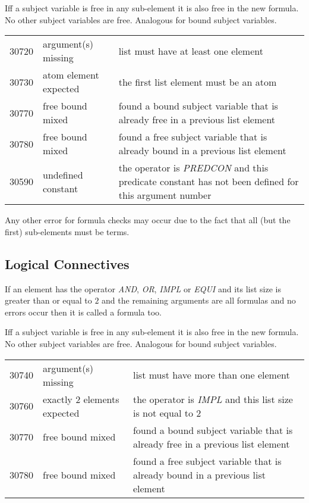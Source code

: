 \documentclass[a4paper,german,10pt,twoside]{book}
\theoremstyle{definition}
\theoremstyle{remark}
\begin{document}
\par
Iff a subject variable is free in any sub-element it is also free in the new formula. No other subject variables are free. Analogous for bound subject variables. 

\begin{tabularx}{\linewidth}{llX}
  30720  & argument(s) missing      & list must have at least one element \\
  30730  & atom element expected    & the first list element must be an atom \\ 
  30770  & free bound mixed         & found a bound subject variable that is already free in a previous list element \\
  30780  & free bound mixed         & found a free subject variable that is already bound in a previous list element \\
  30590  & undefined constant       & the operator is \emph{PREDCON} and this predicate constant has not been defined for this argument number
\end{tabularx}

\par
Any other error for formula checks may occur due to the fact that all (but the first) sub-elements must be terms.


\subsection{Logical Connectives
}
If an element has the operator \emph{AND}, \emph{OR}, \emph{IMPL} or \emph{EQUI} and its list size is greater than or equal to $2$ and the remaining arguments are all formulas and no errors occur then it is called a formula too.

\par
Iff a subject variable is free in any sub-element it is also free in the new formula. No other subject variables are free. Analogous for bound subject variables. 

\begin{tabularx}{\linewidth}{llX}
  30740  & argument(s) missing      & list must have more than one element \\
  30760  & exactly $2$ elements expected & the operator is \emph{IMPL} and this list size is not equal to $2$ \\
  30770  & free bound mixed         & found a bound subject variable that is already free in a previous list element \\
  30780  & free bound mixed         & found a free subject variable that is already bound in a previous list element
\end{tabularx}
\end{document}
